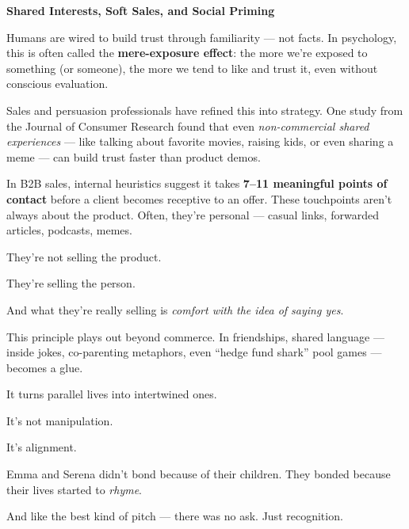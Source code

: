 \begin{PsychologicalSidebar}{\textbf{Shared Interests, Soft Sales, and Social Priming}}

    Humans are wired to build trust through familiarity — not facts.  
    In psychology, this is often called the \textbf{mere-exposure effect}: the more we're 
    exposed to something (or someone), the more we tend to like and trust it, even without 
    conscious evaluation.
    
    \medskip
    
    Sales and persuasion professionals have refined this into strategy.  
    One study from the Journal of Consumer Research found that even \textit{non-commercial 
    shared experiences} — like talking about favorite movies, raising kids, or even sharing a 
    meme — can build trust faster than product demos.
    
    \medskip
    
    In B2B sales, internal heuristics suggest it takes \textbf{7–11 meaningful points of contact} 
    before a client becomes receptive to an offer. These touchpoints aren’t always about 
    the product. 
    Often, they’re personal — casual links, forwarded articles, podcasts, memes.

    \medskip
    
    
    They’re not selling the product.

    \medskip
    
    
    They’re selling the person.

    \medskip
    
    
    And what they’re really selling is \textit{comfort with the idea of saying yes}.
    
    \medskip
    
    This principle plays out beyond commerce. In friendships, shared language — inside jokes, 
    co-parenting metaphors, even “hedge fund shark” pool games — becomes a glue.

    \medskip
    
    
    It turns parallel lives into intertwined ones.

    \medskip
    
    
    It’s not manipulation.

    \medskip
    
    
    It’s alignment.

    \medskip
    
    Emma and Serena didn’t bond because of their children.  
    They bonded because their lives started to \textit{rhyme}.

    \medskip
    
    
    And like the best kind of pitch — there was no ask.  
    Just recognition.
    
\end{PsychologicalSidebar}
